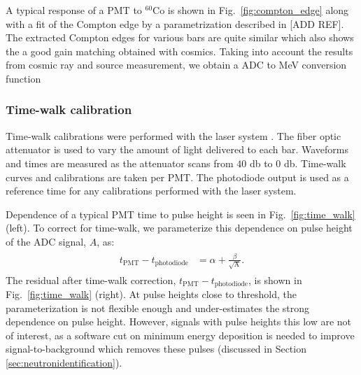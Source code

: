 \documentclass[3p,final,twocolumn]{elsarticle}
\begin{document}
A typical response of a PMT to  $^{60}$Co is shown in Fig.~\ref{fig:compton_edge} along with a fit of the Compton edge by a parametrization described in [ADD REF]. The extracted Compton edges for various bars are quite similar which also shows the a good gain matching obtained with cosmics. Taking into account the results from cosmic ray and  source measurement, we obtain a ADC to MeV conversion function



\subsubsection{Time-walk calibration}
Time-walk calibrations were performed with the laser system \cite{band-laser}. The fiber optic attenuator \cite{attenuator} is used to vary
the amount of light delivered to each bar. Waveforms and times are measured as the attenuator scans from $40$ \si{\decibel} to $0$ 
\si{\decibel}. Time-walk curves and calibrations are taken per PMT. The photodiode output is used as a reference time for any calibrations 
performed with the laser system.

Dependence of a typical PMT time to pulse height is seen in Fig.~\ref{fig:time_walk} (left). To correct for time-walk, we parameterize 
this dependence on pulse height of the ADC signal, $A$, as:
\begin{eqnarray}
	\begin{split}
		t_{\mathrm{PMT}}-t_{\mathrm{photodiode}}	&= \alpha + \frac{\beta}{\sqrt{\textrm{A}}}.				
		\label{eqn:time_walk}
	\end{split}
\end{eqnarray}
The residual after time-walk correction, $t_{\mathrm{PMT}}-t_{\mathrm{photodiode}}$, is shown in Fig.~\ref{fig:time_walk} (right). At pulse heights close to threshold, the 
parameterization is not flexible enough and under-estimates the strong dependence on pulse height. However, signals with pulse 
heights this low are not of interest, as a software cut on minimum energy deposition is needed to improve signal-to-background 
which removes these pulses (discussed in Section \ref{sec:neutronidentification}).
\end{document}
